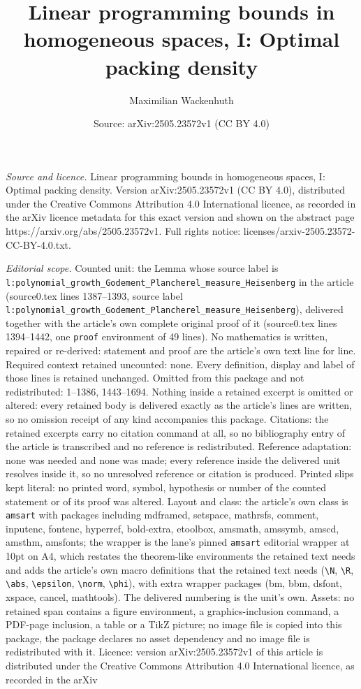 \documentclass[10pt,a4paper]{amsart}
\title[Linear programming bounds in homogeneous spaces, I: Optimal ]{Linear programming bounds in homogeneous spaces, I: Optimal packing density}
\author{Maximilian Wackenhuth}
\date{Source: arXiv:2505.23572v1 (CC BY 4.0)}
\begin{document}
\maketitle

\noindent\emph{Source and licence.} Linear programming bounds in homogeneous spaces, I: Optimal packing density. Version arXiv:2505.23572v1 (CC BY 4.0), distributed under the Creative Commons Attribution 4.0 International licence, as recorded in the arXiv licence metadata for this exact version and shown on the abstract page https://arxiv.org/abs/2505.23572v1. Full rights notice: licenses/arxiv-2505.23572-CC-BY-4.0.txt.\par\smallskip

\noindent\textit{Editorial scope.} Counted unit: the Lemma whose source label is \texttt{l:polynomial\_growth\_Godement\_Plancherel\_measure\_Heisenberg} in the article (source0.tex lines 1387--1393, source label \texttt{l:polynomial\_growth\_Godement\_Plancherel\_measure\_Heisenberg}), delivered together with the article's own complete original proof of it (source0.tex lines 1394--1442, one \texttt{proof} environment of 49 lines). No mathematics is written, repaired or re-derived: statement and proof are the article's own text line for line. Required context retained uncounted: none. Every definition, display and label of those lines is retained unchanged. Omitted from this package and not redistributed: 1--1386, 1443--1694. Nothing inside a retained excerpt is omitted or altered: every retained body is delivered exactly as the article's lines are written, so no omission receipt of any kind accompanies this package. Citations: the retained excerpts carry no citation command at all, so no bibliography entry of the article is transcribed and no reference is redistributed. Reference adaptation: none was needed and none was made; every reference inside the delivered unit resolves inside it, so no unresolved reference or citation is produced. Printed slips kept literal: no printed word, symbol, hypothesis or number of the counted statement or of its proof was altered. Layout and class: the article's own class is \texttt{amsart} with packages including mdframed, setspace, mathrsfs, comment, inputenc, fontenc, hyperref, bold-extra, etoolbox, amsmath, amssymb, amscd, amsthm, amsfonts; the wrapper is the lane's pinned \texttt{amsart} editorial wrapper at 10pt on A4, which restates the theorem-like environments the retained text needs and adds the article's own macro definitions that the retained text needs (\texttt{\textbackslash N}, \texttt{\textbackslash R}, \texttt{\textbackslash abs}, \texttt{\textbackslash epsilon}, \texttt{\textbackslash norm}, \texttt{\textbackslash phi}), with extra wrapper packages (bm, bbm, dsfont, xspace, cancel, mathtools). The delivered numbering is the unit's own. Assets: no retained span contains a figure environment, a graphics-inclusion command, a PDF-page inclusion, a table or a TikZ picture; no image file is copied into this package, the package declares no asset dependency and no image file is redistributed with it. Licence: version arXiv:2505.23572v1 of this article is distributed under the Creative Commons Attribution 4.0 International licence, as recorded in the arXiv 
\end{document}
